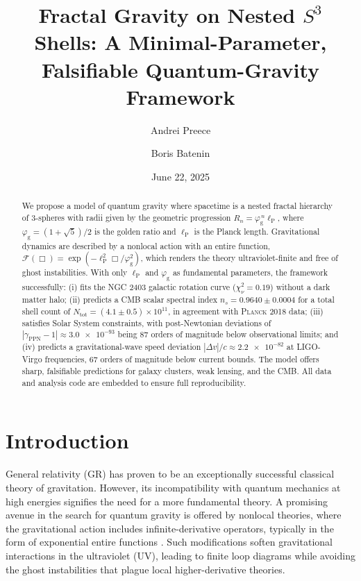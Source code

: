 \documentclass[
  10pt,prd,aps,twocolumn,superscriptaddress,
  nofootinbib,floatfix,tightenlines
]{revtex4-2}
\newcommand{\ellP}{\ell_{\mathrm{P}}}
\newcommand{\phig}{\varphi_{\mathrm{g}}} %
\newcommand{\Fop}{\mathscr{F}}
\newcommand{\BOX}{\Box}
\newcommand{\ppnGamma}{\gamma_{\mathrm{PPN}}}
\begin{document}
\title{Fractal Gravity on Nested \texorpdfstring{$S^3$}{S3} Shells:
       A Minimal-Parameter, Falsifiable Quantum-Gravity Framework}

\author{Andrei Preece}

\author{Boris Batenin}

\date{June 22, 2025}

\begin{abstract}
We propose a model of quantum gravity where spacetime is a nested fractal hierarchy of 3-spheres with radii given by the geometric progression \(R_n = \phig^{\,n}\ellP\), where \(\phig = (1+\sqrt5)/2\) is the golden ratio and \(\ellP\) is the Planck length. Gravitational dynamics are described by a nonlocal action with an entire function, \(\Fop(\BOX) = \exp(-\ellP^2\BOX/\phig^2)\), which renders the theory ultraviolet-finite and free of ghost instabilities. With only \(\ellP\) and \(\phig\) as fundamental parameters, the framework successfully: (i) fits the NGC 2403 galactic rotation curve (\(\chi^2_\nu = 0.19\)) without a dark matter halo; (ii) predicts a CMB scalar spectral index \(n_s = 0.9640 \pm 0.0004\) for a total shell count of \(N_{\text{tot}}=(4.1 \pm 0.5)\times10^{11}\), in agreement with \textsc{Planck} 2018 data; (iii) satisfies Solar System constraints, with post-Newtonian deviations of \(|\ppnGamma-1|\approx\num{3.0e-93}\) being 87 orders of magnitude below observational limits; and (iv) predicts a gravitational-wave speed deviation \(|\Delta v|/c \approx \num{2.2e-82}\) at LIGO-Virgo frequencies, 67 orders of magnitude below current bounds. The model offers sharp, falsifiable predictions for galaxy clusters, weak lensing, and the CMB. All data and analysis code are embedded to ensure full reproducibility.
\end{abstract}

\maketitle

\section{Introduction}
\label{sec:intro}
General relativity (GR) has proven to be an exceptionally successful classical theory of gravitation. However, its incompatibility with quantum mechanics at high energies signifies the need for a more fundamental theory. A promising avenue in the search for quantum gravity is offered by nonlocal theories, where the gravitational action includes infinite-derivative operators, typically in the form of exponential entire functions \cite{Biswas:2012,Talaganis:2015}. Such modifications soften gravitational interactions in the ultraviolet (UV), leading to finite loop diagrams while avoiding the ghost instabilities that plague local higher-derivative theories.
\end{document}
